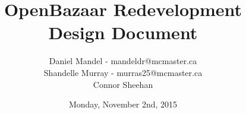\documentclass{article}
\begin{document}
\title{OpenBazaar Redevelopment Design Document}
\author{Daniel Mandel - mandeldr@mcmaster.ca\\Shandelle Murray - murras25@mcmaster.ca\\Connor Sheehan}
\date{Monday, November 2nd, 2015}
\maketitle
\end{document}
